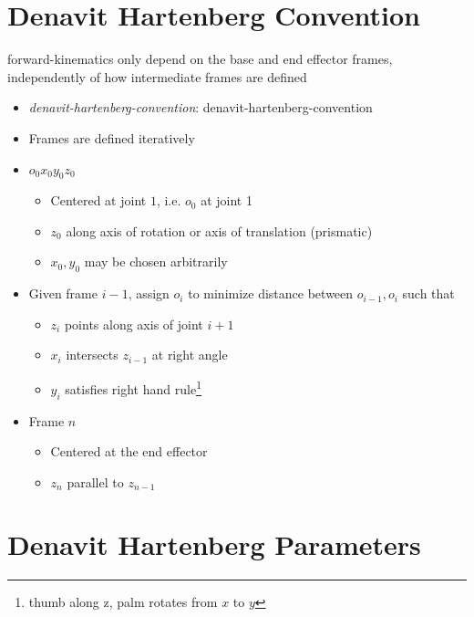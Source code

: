\section{Denavit Hartenberg Convention}

  \Gls{forward-kinematics} only depend on the base and end effector frames,
  independently of how intermediate frames are defined

  \begin{itemize}
    \item \emph{\Gls{denavit-hartenberg-convention}}: \glsdesc{denavit-hartenberg-convention}
    \item Frames are defined iteratively
    \item $ o_{0} x_{0} y_{0} z_{0} $
    \begin{itemize}
      \item Centered at joint $ 1 $, i.e. $ o_{0} $ at joint 1
      \item $ z_{0} $ along axis of rotation or axis of translation (prismatic)
      \item $ x_{0}, y_{0} $ may be chosen arbitrarily
    \end{itemize}

    \item Given frame $ i - 1 $, assign $ o_{i} $ to minimize distance between
    $ o_{i - 1}, o_{i} $ such that
    \begin{itemize}
      \item $ z_{i} $ points along axis of joint $ i + 1 $
      \item $ x_{i} $ intersects $ z_{i - 1} $ at right angle
      \item $ y_{i} $ satisfies right hand rule\footnote{thumb along z, palm
      rotates from $ x $ to $ y $}
    \end{itemize}

    \item Frame $ n $
    \begin{itemize}
      \item Centered at the end effector
      \item $ z_{n} $ parallel to $ z_{n - 1} $
    \end{itemize}
  \end{itemize}

\section{Denavit Hartenberg Parameters}

